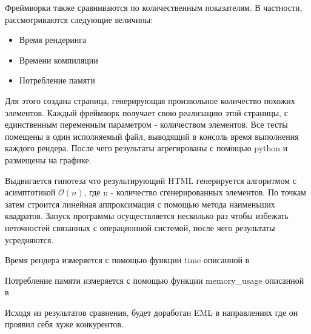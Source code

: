 Фреймворки также сравниваются по количественным показателям. В частности, рассмотриваются следующие величины:

\begin{itemize}
    \item Время рендеринга
    \item Времени компиляции
    \item Потребление памяти
\end{itemize}

Для этого создана страница, генерирующая произвольное количество похожих элементов.
Каждый фреймворк получает свою реализацию этой страницы, с единственным переменным параметром - количеством элементов.
Все тесты помещены в один исполняемый файл, выводящий в консоль время выполнения каждого рендера.
После чего результаты агрегированы с помощью python и размещены на графике.

Выдвигается гипотеза что результирующий HTML генерируется алгоритмом с асимптотикой $\mathcal{O}(n)$, где n - количество сгенерированных элементов.
По точкам затем строится линейная аппроксимация с помощью метода наименьших квадратов.
Запуск программы осуществляется несколько раз чтобы избежать неточностей связанных с операционной системой, после чего результаты усредняются.

Время рендера измеряется с помощью функции time описанной в %

Потребление памяти измеряется с помощью функции memory\_usage описанной в %

Исходя из результатов сравнения, будет доработан EML в направлениях где он проявил себя хуже конкурентов.

